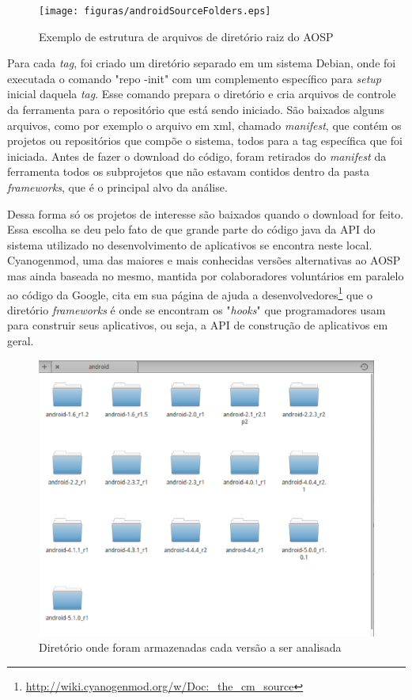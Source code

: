 \begin{figure}[!htb]
\centering
\texttt{[image: figuras/androidSourceFolders.eps]}
\caption{Exemplo de estrutura de arquivos de diretório raiz do AOSP}
\label{androidSourceFolders}
\end{figure}

Para cada \textit{tag}, foi criado um diretório separado em um sistema Debian, onde foi executada o comando "repo -init" com um complemento específico para \textit{setup} inicial daquela \textit{tag}. Esse comando prepara o diretório e cria arquivos de controle da ferramenta para o repositório que está sendo iniciado. São baixados alguns arquivos, como por exemplo o arquivo em xml, chamado \textit{manifest}, que contém os projetos ou repositórios que compõe o sistema, todos para a tag específica que foi iniciada. Antes de fazer o download do código, foram retirados do \textit{manifest} da ferramenta todos os subprojetos que não estavam contidos dentro da pasta \textit{frameworks}, que é o principal alvo da análise. 

Dessa forma só os projetos de interesse são baixados quando o download for feito. Essa escolha se deu pelo fato de que grande parte do código java da API do sistema utilizado no desenvolvimento de aplicativos se encontra neste local. Cyanogenmod, uma das maiores e mais conhecidas versões alternativas ao AOSP mas ainda baseada no mesmo, mantida por colaboradores voluntários em paralelo ao código da Google, cita em sua página de ajuda a desenvolvedores\footnote{\url{http://wiki.cyanogenmod.org/w/Doc:_the_cm_source}}  que o diretório \textit{frameworks} é onde se encontram os "\textit{hooks}" que programadores usam para construir seus aplicativos, ou seja, a API de construção de aplicativos em geral. 

\begin{figure}[!htb]
\centering
\includegraphics [keepaspectratio=true,scale=0.35]{figuras/folder.eps}
\caption{Diretório onde foram armazenadas cada versão a ser analisada}
\label{folder}
\end{figure}

